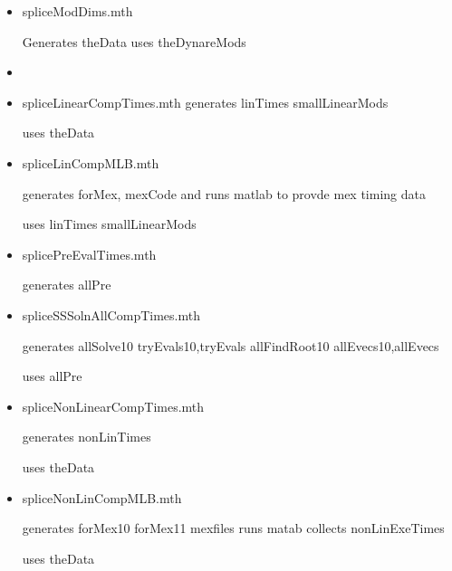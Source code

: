 \documentclass[12pt]{article}
\begin{document}
\begin{itemize}
\item spliceModDims.mth

Generates theData uses theDynareMods




\item
\item spliceLinearCompTimes.mth
generates linTimes smallLinearMods

uses theData

\item spliceLinCompMLB.mth

generates forMex, mexCode  and runs matlab to provde mex timing data

uses linTimes smallLinearMods



\item splicePreEvalTimes.mth

generates allPre





\item spliceSSSolnAllCompTimes.mth

generates allSolve10 tryEvals10,tryEvals allFindRoot10 allEvecs10,allEvecs

uses allPre 
 


\item spliceNonLinearCompTimes.mth

generates nonLinTimes

uses theData



\item spliceNonLinCompMLB.mth

generates forMex10 forMex11  mexfiles runs matab collects nonLinExeTimes

uses theData



\end{itemize}
\end{document}
